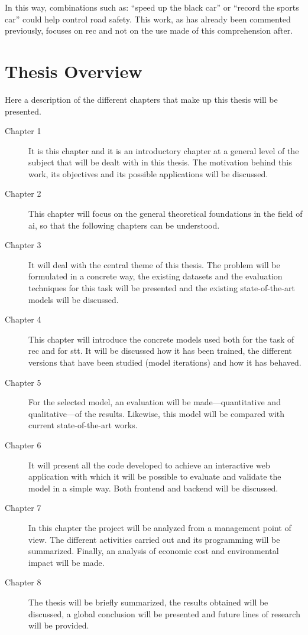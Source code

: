 In this way, combinations such as: ``speed up the black car'' or ``record the
sports car'' could help control road safety. This work, as has already been
commented previously, focuses on \gls{rec} and not on the use made of this
comprehension after.



\section{Thesis Overview}

Here a description of the different chapters that make up this thesis will be
presented.

\begin{description}
  \item [Chapter 1] It is this chapter and it is an introductory chapter at a
  general level of the subject that will be dealt with in this thesis. The
  motivation behind this work, its objectives and its possible applications
  will be discussed. 
  \item [Chapter 2] This chapter will focus on the general theoretical
  foundations in the field of \gls{ai}, so that the following chapters can be
  understood. 
  \item [Chapter 3] It will deal with the central theme of this thesis. The
  problem will be formulated in a concrete way, the existing datasets and the
  evaluation techniques for this task will be presented and the existing
  state-of-the-art models will be discussed. 
  \item [Chapter 4] This chapter will introduce the concrete models used both
  for the task of \gls{rec} and for \gls{stt}. It will be discussed how it has
  been trained, the different versions that have been studied (model
  iterations) and how it has behaved. 
  \item [Chapter 5] For the selected model, an evaluation will be
  made---quantitative and qualitative---of the results. Likewise, this model
  will be compared with current state-of-the-art works. 
  \item [Chapter 6] It will present all the code developed to achieve an
  interactive web application with which it will be possible to evaluate and
  validate the model in a simple way. Both frontend and backend will be
  discussed. 
  \item [Chapter 7] In this chapter the project will be analyzed from a
  management point of view. The different activities carried out and its
  programming will be summarized. Finally, an analysis of economic cost and
  environmental impact will be made. 
  \item [Chapter 8] The thesis will be briefly summarized, the results obtained
  will be discussed, a global conclusion will be presented and future lines of
  research will be provided. 
\end{description}

